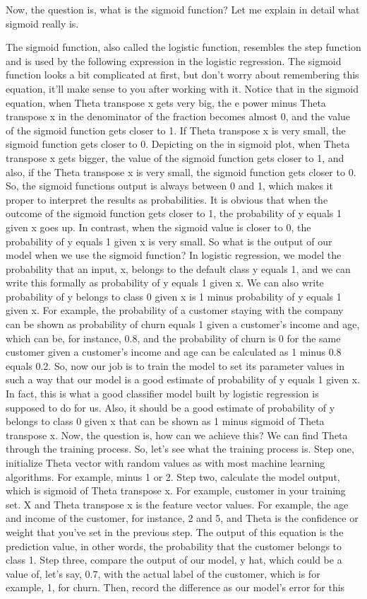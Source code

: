 	Now, the question is, what is the sigmoid function? Let me explain in detail what sigmoid really is. 
	
	The sigmoid function, also called the logistic function, resembles the step function and is used by the following expression in the logistic regression. The sigmoid function looks a bit complicated at first, but don't worry about remembering this equation, it'll make sense to you after working with it. Notice that in the sigmoid equation, when Theta transpose x gets very big, the e power minus Theta transpose x in the denominator of the fraction becomes almost 0, and the value of the sigmoid function gets closer to 1. If Theta transpose x is very small, the sigmoid function gets closer to 0. Depicting on the in sigmoid plot, when Theta transpose x gets bigger, the value of the sigmoid function gets closer to 1, and also, if the Theta transpose x is very small, the sigmoid function gets closer to 0. So, the sigmoid functions output is always between 0 and 1, which makes it proper to interpret the results as probabilities. It is obvious that when the outcome of the sigmoid function gets closer to 1, the probability of y equals 1 given x goes up. In contrast, when the sigmoid value is closer to 0, the probability of y equals 1 given x is very small. So what is the output of our model when we use the sigmoid function? In logistic regression, we model the probability that an input, x, belongs to the default class y equals 1, and we can write this formally as probability of y equals 1 given x. We can also write probability of y belongs to class 0 given x is 1 minus probability of y equals 1 given x. For example, the probability of a customer staying with the company can be shown as probability of churn equals 1 given a customer's income and age, which can be, for instance, 0.8, and the probability of churn is 0 for the same customer given a customer's income and age can be calculated as 1 minus 0.8 equals 0.2. So, now our job is to train the model to set its parameter values in such a way that our model is a good estimate of probability of y equals 1 given x. In fact, this is what a good classifier model built by logistic regression is supposed to do for us. Also, it should be a good estimate of probability of y belongs to class 0 given x that can be shown as 1 minus sigmoid of Theta transpose x. Now, the question is, how can we achieve this? We can find Theta through the training process. So, let's see what the training process is. Step one, initialize Theta vector with random values as with most machine learning algorithms. For example, minus 1 or 2. Step two, calculate the model output, which is sigmoid of Theta transpose x. For example, customer in your training set. X and Theta transpose x is the feature vector values. For example, the age and income of the customer, for instance, 2 and 5, and Theta is the confidence or weight that you've set in the previous step. The output of this equation is the prediction value, in other words, the probability that the customer belongs to class 1. Step three, compare the output of our model, y hat, which could be a value of, let's say, 0.7, with the actual label of the customer, which is for example, 1, for churn. Then, record the difference as our model's error for this 